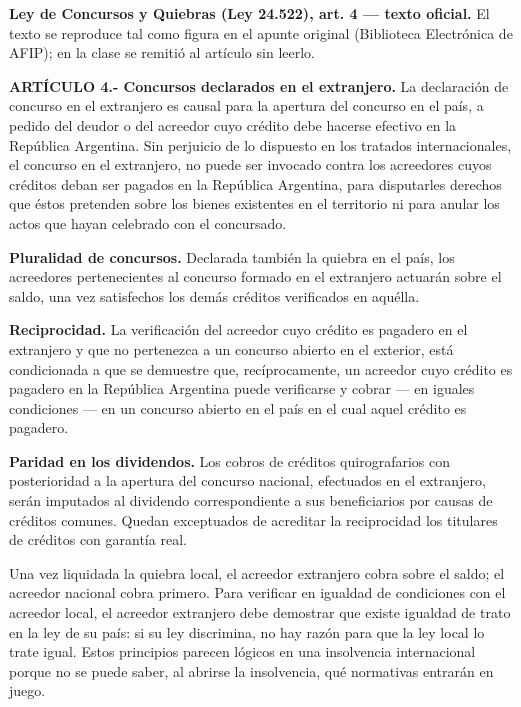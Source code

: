 \documentclass[12pt,oneside]{book}
\begin{document}
\begin{note}
\textbf{Ley de Concursos y Quiebras (Ley 24.522), art. 4 --- texto oficial.} El texto se reproduce tal como figura en el apunte original (Biblioteca Electrónica de AFIP); en la clase se remitió al artículo sin leerlo.

\textbf{ARTÍCULO 4.- Concursos declarados en el extranjero.} La declaración de concurso en el extranjero es causal para la apertura del concurso en el país, a pedido del deudor o del acreedor cuyo crédito debe hacerse efectivo en la República Argentina. Sin perjuicio de lo dispuesto en los tratados internacionales, el concurso en el extranjero, no puede ser invocado contra los acreedores cuyos créditos deban ser pagados en la República Argentina, para disputarles derechos que éstos pretenden sobre los bienes existentes en el territorio ni para anular los actos que hayan celebrado con el concursado.

\textbf{Pluralidad de concursos.} Declarada también la quiebra en el país, los acreedores pertenecientes al concurso formado en el extranjero actuarán sobre el saldo, una vez satisfechos los demás créditos verificados en aquélla.

\textbf{Reciprocidad.} La verificación del acreedor cuyo crédito es pagadero en el extranjero y que no pertenezca a un concurso abierto en el exterior, está condicionada a que se demuestre que, recíprocamente, un acreedor cuyo crédito es pagadero en la República Argentina puede verificarse y cobrar --- en iguales condiciones --- en un concurso abierto en el país en el cual aquel crédito es pagadero.

\textbf{Paridad en los dividendos.} Los cobros de créditos quirografarios con posterioridad a la apertura del concurso nacional, efectuados en el extranjero, serán imputados al dividendo correspondiente a sus beneficiarios por causas de créditos comunes. Quedan exceptuados de acreditar la reciprocidad los titulares de créditos con garantía real.
\end{note}

Una vez liquidada la quiebra local, el acreedor extranjero cobra sobre el saldo; el acreedor nacional cobra primero. Para verificar en igualdad de condiciones con el acreedor local, el acreedor extranjero debe demostrar que existe igualdad de trato en la ley de su país: si su ley discrimina, no hay razón para que la ley local lo trate igual. Estos principios parecen lógicos en una insolvencia internacional porque no se puede saber, al abrirse la insolvencia, qué normativas entrarán en juego.
\end{document}
